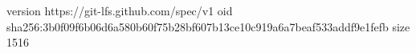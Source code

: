 version https://git-lfs.github.com/spec/v1
oid sha256:3b0f09f6b06d6a580b60f75b28bf607b13ce10c919a6a7beaf533addf9e1fefb
size 1516
